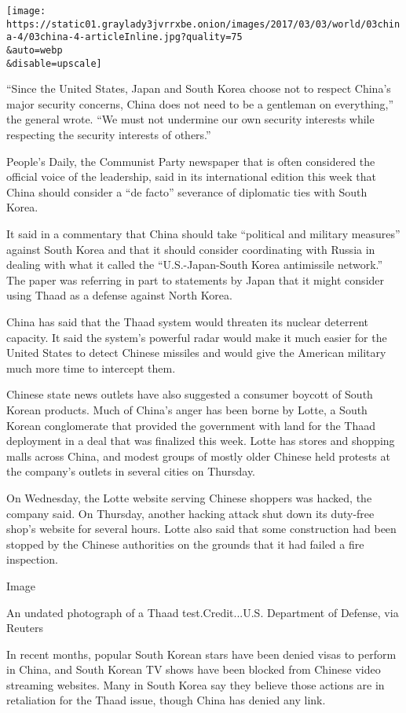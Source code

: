 \texttt{[image: https://static01.graylady3jvrrxbe.onion/images/2017/03/03/world/03china-4/03china-4-articleInline.jpg?quality=75\\\&auto=webp\\\&disable=upscale]}

``Since the United States, Japan and South Korea choose not to respect
China's major security concerns, China does not need to be a gentleman
on everything,'' the general wrote. ``We must not undermine our own
security interests while respecting the security interests of others.''

People's Daily, the Communist Party newspaper that is often considered
the official voice of the leadership, said in its international edition
this week that China should consider a ``de facto'' severance of
diplomatic ties with South Korea.

It said in a commentary that China should take ``political and military
measures'' against South Korea and that it should consider coordinating
with Russia in dealing with what it called the ``U.S.-Japan-South Korea
antimissile network.'' The paper was referring in part to statements by
Japan that it might consider using Thaad as a defense against North
Korea.

China has said that the Thaad system would threaten its nuclear
deterrent capacity. It said the system's powerful radar would make it
much easier for the United States to detect Chinese missiles and would
give the American military much more time to intercept them.

Chinese state news outlets have also suggested a consumer boycott of
South Korean products. Much of China's anger has been borne by Lotte, a
South Korean conglomerate that provided the government with land for the
Thaad deployment in a deal that was finalized this week. Lotte has
stores and shopping malls across China, and modest groups of mostly
older Chinese held protests at the company's outlets in several cities
on Thursday.

On Wednesday, the Lotte website serving Chinese shoppers was hacked, the
company said. On Thursday, another hacking attack shut down its
duty-free shop's website for several hours. Lotte also said that some
construction had been stopped by the Chinese authorities on the grounds
that it had failed a fire inspection.

Image

An undated photograph of a Thaad test.Credit...U.S. Department of
Defense, via Reuters

In recent months, popular South Korean stars have been denied visas to
perform in China, and South Korean TV shows have been blocked from
Chinese video streaming websites. Many in South Korea say they believe
those actions are in retaliation for the Thaad issue, though China has
denied any link.

